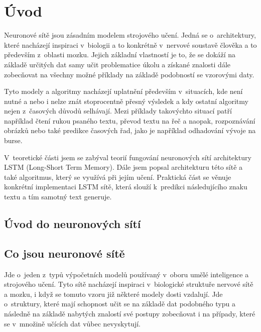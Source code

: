 \documentclass[a4paper]{article}
\begin{document}
\section*{Úvod}
Neuronové sítě jsou zásadním modelem strojového učení. Jedná se o~architektury, které nacházejí inspiraci v~biologii a to konkrétně v~nervové soustavě člověka a to především z~oblasti mozku. Jejich základní vlastností je to, že se dokáží na základě určitých dat samy učit problematice úkolu a získané znalosti dále zobecňovat na všechny možné příklady na základě podobností se vzorovými daty.\par
Tyto modely a algoritmy nacházejí uplatnění především v~situacích, kde není nutné a nebo i nelze znát stoprocentně přesný výsledek a kdy ostatní algoritmy nejen z~časových důvodů selhávají. Mezi příklady takovýchto situací patří například čtení rukou psaného textu, převod textu na řeč a naopak, rozpoznávání obrázků nebo také predikce časových řad, jako je například odhadování vývoje na burse.\par
V~teoretické části jsem se zabýval teorií fungování neuronových sítí architektury LSTM (Long-Short Term Memory). Dále jsem popsal architekturu této sítě a také algoritmus, který se využívá při jejím učení.
Praktická část se věnuje konkrétní implementaci LSTM sítě, která slouží k~predikci následujícího znaku textu a tím samotný text generuje.
\newpage
\begin{center}
\section{Úvod do neuronových sítí}
\end{center}
\subsection{Co jsou neuronové sítě}
Jde o~jeden z~typů výpočetních modelů používaný v~oboru umělé inteligence a strojového učení. Tyto sítě nacházejí inspiraci v~biologické struktuře nervové sítě a mozku, i když se tomuto vzoru již některé modely dosti vzdalují. Jde o~struktury, které mají schopnost učit se na základě dat podobného typu a následně na základě nabytých znalostí své postupy zobecňovat i na případy, které se v~množině učících dat vůbec nevyskytují.
\end{document}
